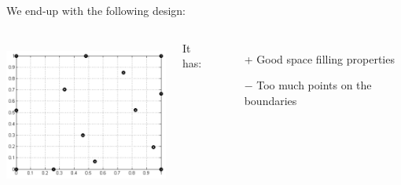 \begin{frame}{}
We end-up with the following design:
\begin{columns}[c]
\column{6cm}
\begin{center}
\includegraphics[height=5cm]{2_Design_of_experiments/figures/adaptativefinal}
\end{center}
\column{5cm}
It has:
\begin{itemize}
	\item[+] Good space filling properties
	\item[$-$] Too much points on the boundaries
\end{itemize}
\end{columns}
\end{frame}
